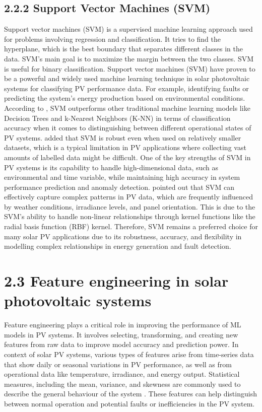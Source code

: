 \subsection{2.2.2 Support Vector Machines (SVM)}
Support vector machines (SVM) is a supervised machine learning approach used for problems involving regression and classification. It tries to find the hyperplane, which is the best boundary that separates different classes in the data. SVM’s main goal is to maximize the margin between the two classes. SVM is useful for binary classification. Support vector machines (SVM) have proven to be a powerful and widely used machine learning technique in solar photovoltaic systems for classifying PV performance data. For example, identifying faults or predicting the system’s energy production based on environmental conditions. According to \parencite{Kumar et al._2020}, SVM outperforms other traditional machine learning models like Decision Trees and k-Nearest Neighbors (K-NN) in terms of classification accuracy when it comes to distinguishing between different operational states of PV systems. \parencite{Siddiqui et al._2020} added that SVM is robust even when used on relatively smaller datasets, which is a typical limitation in PV applications where collecting vast amounts of labelled data might be difficult. One of the key strengths of SVM in PV systems is its capability to handle high-dimensional data, such as environmental and time variable, while maintaining high accuracy in system performance prediction and anomaly detection. \parencite{Shen et al._2020} pointed out that SVM can effectively capture complex patterns in PV data, which are frequently influenced by weather conditions, irradiance levels, and panel orientation. This is due to the SVM’s ability to handle non-linear relationships through kernel functions like the radial basis function (RBF) kernel. Therefore, SVM remains a preferred choice for many solar PV applications due to its robustness, accuracy, and flexibility in modelling complex relationships in energy generation and fault detection.

\section{2.3 Feature engineering in solar photovoltaic systems}
Feature engineering plays a critical role in improving the performance of ML models in PV systems. It involves selecting, transforming, and creating new features from raw data to improve model accuracy and prediction power. In context of solar PV systems, various types of features arise from time-series data that show daily or seasonal variations in PV performance, as well as from operational data like temperature, irradiance, and energy output. Statistical measures, including the mean, variance, and skewness are commonly used to describe the general behaviour of the system \parencite{Dinakar et al._2021}. These features can help distinguish between normal operation and potential faults or inefficiencies in the PV system. 

